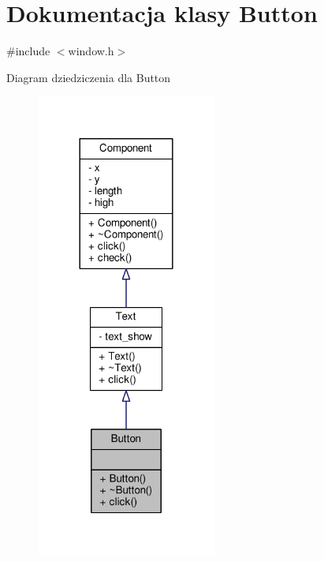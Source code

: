 \hypertarget{classButton}{}\section{Dokumentacja klasy Button}
\label{classButton}


{\ttfamily \#include $<$window.\+h$>$}



Diagram dziedziczenia dla Button\nopagebreak
\begin{figure}[H]
\begin{center}
\leavevmode
\includegraphics[width=168pt]{classButton__inherit__graph}
\end{center}
\end{figure}


